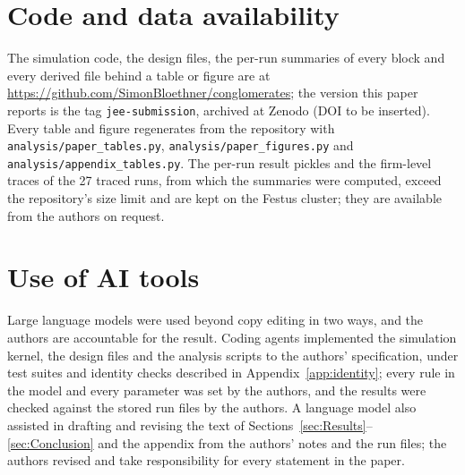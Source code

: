 \documentclass[12pt,a4paper]{article}
\begin{document}
\section*{Code and data availability}
The simulation code, the design files, the per-run summaries of every block and every derived file behind a table or figure are at \url{https://github.com/SimonBloethner/conglomerates}; the version this paper reports is the tag \texttt{jee-submission}, archived at Zenodo (DOI to be inserted). Every table and figure regenerates from the repository with \texttt{analysis/paper\_tables.py}, \texttt{analysis/paper\_figures.py} and \texttt{analysis/appendix\_tables.py}. The per-run result pickles and the firm-level traces of the 27 traced runs, from which the summaries were computed, exceed the repository's size limit and are kept on the Festus cluster; they are available from the authors on request.

\section*{Use of AI tools}
Large language models were used beyond copy editing in two ways, and the authors are accountable for the result. Coding agents implemented the simulation kernel, the design files and the analysis scripts to the authors' specification, under test suites and identity checks described in Appendix~\ref{app:identity}; every rule in the model and every parameter was set by the authors, and the results were checked against the stored run files by the authors. A language model also assisted in drafting and revising the text of Sections~\ref{sec:Results}--\ref{sec:Conclusion} and the appendix from the authors' notes and the run files; the authors revised and take responsibility for every statement in the paper.

\clearpage
\printbibliography

\clearpage

\end{document}
